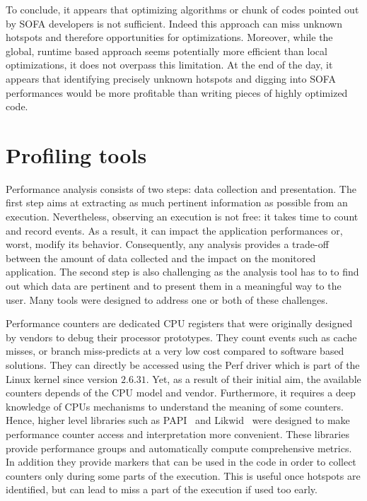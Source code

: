 To conclude, it appears that optimizing algorithms or chunk of codes pointed out by \gls{SOFA} developers is not sufficient.
Indeed this approach can miss unknown hotspots and therefore opportunities for optimizations.
Moreover, while the global, runtime based approach seems potentially more efficient than local optimizations, it does not overpass this limitation.
At the end of the day, it appears that identifying precisely unknown hotspots and digging into \gls{SOFA} performances would be more profitable than writing pieces of highly optimized code.

\section{Profiling tools}
\label{sec:prof-tools}

Performance analysis consists of two steps: data collection and presentation.
The first step aims at extracting as much pertinent information as possible from an execution.
Nevertheless, observing an execution is not free: it takes time to count and record events.
As a result, it can impact the application performances or, worst, modify its behavior.
Consequently, any analysis provides a trade-off between the amount of data collected and the impact on the monitored application.
The second step is also challenging as the analysis tool has to to find out which data are pertinent and to present them in a meaningful way to the user.
Many tools were designed to address one or both of these challenges.

Performance counters are dedicated \gls{CPU} registers that were originally designed by vendors to debug their processor prototypes.
They count events such as cache misses, or branch miss-predicts at a very low cost compared to software based solutions.
They can directly be accessed using the \gls{Perf} driver which is part of the \gls{Linux} kernel since version $2.6.31$.
Yet, as a result of their initial aim, the available counters depends of the \gls{CPU} model and vendor.
Furthermore, it requires a deep knowledge of \glspl{CPU} mechanisms to understand the meaning of some counters.
Hence, higher level libraries such as \gls{PAPI}~\cite{Browne00Portable,Malony11Parallel,Weaver13PAPI} and \gls{Likwid}~\cite{Treibig10LIKWID} were designed to make performance counter access and interpretation more convenient.
These libraries provide performance groups and automatically compute comprehensive metrics.
In addition they provide markers that can be used in the code in order to collect counters only during some parts of the execution.
This is useful once hotspots are identified, but can lead to miss a part of the execution if used too early.


